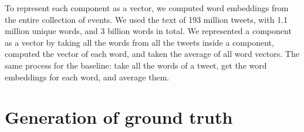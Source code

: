 \documentclass{article}
\begin{document}
To represent each component as a vector, we computed word embeddings
from the entire collection of events. We used the text of 193 million
tweets, with 1.1 million unique words, and 3 billion words in
total. We represented a component as a vector by taking all the words
from all the tweets inside a component, computed the vector of each
word, and taken the average of all word vectors. The same process for
the baseline: take all the words of a tweet, get the word embeddings
for each word, and average them.


\section{Generation of ground truth}
\end{document}
